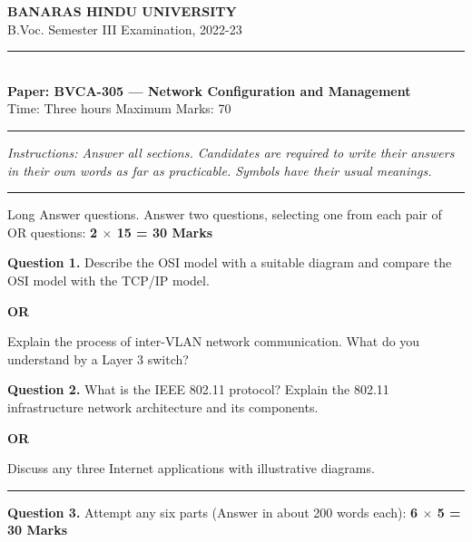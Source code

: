 \documentclass[11pt,a4paper]{article}
\begin{document}
\begin{center}
  {\large\bfseries BANARAS HINDU UNIVERSITY}\\[2pt]
  {
\normalsize B.Voc. Semester III Examination, 2022-23}\\[6pt]
  \rule{0.8\linewidth}{0.5pt}\\[6pt]
  {\large\bfseries Paper: BVCA-305 --- Network Configuration and Management}\\[4pt]
  {
\normalsize Time: Three hours \hfill Maximum Marks: 70}
\end{center}

\rule{\linewidth}{0.4pt}

\smallskip



\noindent   \textit{Instructions: Answer all sections. Candidates are required to write their answers in their own words as far as practicable. Symbols have their usual meanings.}

\bigskip




\rule{\linewidth}{0.4pt}\smallskip

Long Answer questions. Answer two questions, selecting one from each pair of OR questions: \hfill   \textbf{2 $ \times$ 15 = 30 Marks}

\medskip



\noindent   \textbf{Question 1.} Describe the OSI model with a suitable diagram and compare the OSI model with the TCP/IP model.
\centerline{   \textbf{OR}}
Explain the process of inter-VLAN network communication. What do you understand by a Layer 3 switch?

\medskip



\noindent   \textbf{Question 2.} What is the IEEE 802.11 protocol? Explain the 802.11 infrastructure network architecture and its components.
\centerline{   \textbf{OR}}
Discuss any three Internet applications with illustrative diagrams.

\bigskip


\rule{\linewidth}{0.4pt}\smallskip




\noindent   \textbf{Question 3.} Attempt any six parts (Answer in about 200 words each): \hfill   \textbf{6 $ \times$ 5 = 30 Marks}
\end{document}
